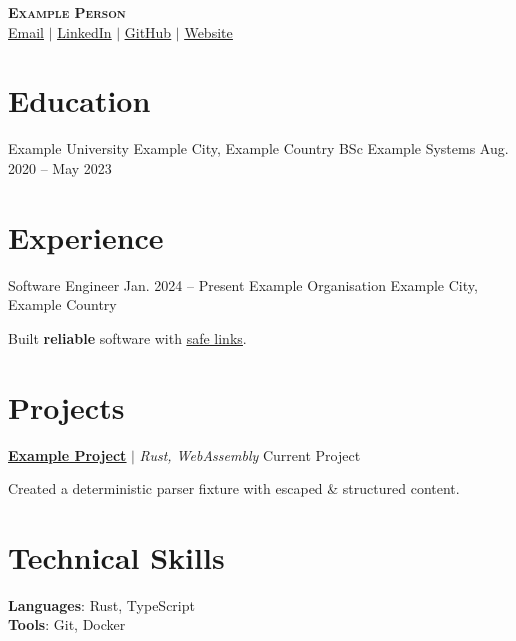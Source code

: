 \documentclass{article}
\newcommand{\resumeItem}[1]{#1}
\newcommand{\resumeSubheading}[4]{#1 #2 #3 #4}
\newcommand{\resumeProjectHeading}[2]{#1 #2}
\newcommand{\resumeSubHeadingListStart}{}
\newcommand{\resumeSubHeadingListEnd}{}
\newcommand{\resumeItemListStart}{}
\newcommand{\resumeItemListEnd}{}
\begin{document}
\begin{center}
    \textbf{\Huge \scshape Example Person} \\ \vspace{1pt}
    \href{mailto:person@example.test}{\underline{Email}} $|$
    \href{https://linkedin.com/in/example}{\underline{LinkedIn}} $|$
    \href{https://github.com/example}{\underline{GitHub}} $|$
    \href{https://example.test/}{\underline{Website}}
\end{center}

\section{Education}
  \resumeSubHeadingListStart
    \resumeSubheading
      {Example University}{Example City, Example Country}
      {BSc Example Systems}{Aug. 2020 -- May 2023}
  \resumeSubHeadingListEnd

\section{Experience}
  \resumeSubHeadingListStart
    \resumeSubheading
      {Software Engineer}{Jan. 2024 -- Present}
      {Example Organisation}{Example City, Example Country}
      \resumeItemListStart
        \resumeItem{Built \textbf{reliable} software with \href{https://example.test/work}{\underline{safe links}}.}
      \resumeItemListEnd
  \resumeSubHeadingListEnd

\section{Projects}
  \resumeSubHeadingListStart
    \resumeProjectHeading
      {\textbf{\href{https://example.test/project}{\underline{Example Project}}} $|$ \emph{Rust, WebAssembly}}{Current Project}
      \resumeItemListStart
        \resumeItem{Created a deterministic parser fixture with escaped \& structured content.}
      \resumeItemListEnd
  \resumeSubHeadingListEnd

\section{Technical Skills}
 \begin{itemize}[leftmargin=0.15in, label={}]
    \small{\item{
     \textbf{Languages}{: Rust, TypeScript} \\
     \textbf{Tools}{: Git, Docker}
    }}
 \end{itemize}
\end{document}
